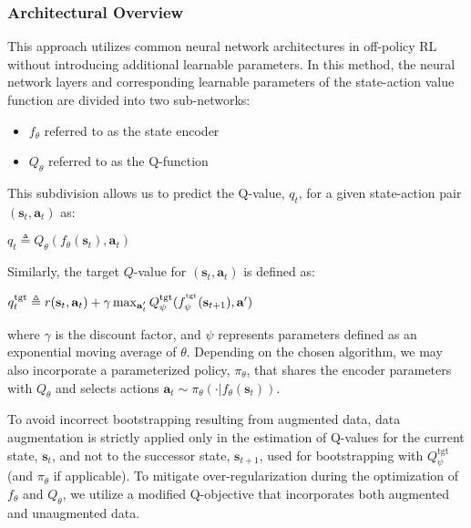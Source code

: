 \subsubsection{\textbf{Architectural Overview}}
This approach utilizes common neural network architectures in off-policy RL without introducing additional learnable parameters. In this method, the neural network layers and corresponding learnable parameters of the state-action value function are divided into two sub-networks:
\begin{itemize}
    \item $f_{\theta}$ referred to as the state encoder
    \item $Q_{\theta}$ referred to as the Q-function
\end{itemize}
This subdivision allows us to predict the Q-value, $q_{t}$, for a given state-action pair $(\mathbf{s}_{t}, \mathbf{a}_{t})$ as:
\begin{center}
$q_{t} \triangleq Q_{\theta}(f_{\theta}(\mathbf{s}_{t}), \mathbf{a}_{t})$
\end{center}
Similarly, the target $Q$-value for $(\mathbf{s}_{t}, \mathbf{a}_{t})$ is defined as:
\begin{center}
$q^{\textnormal{tgt}}_{t} \triangleq r(\mathbf{s}_{t}, \mathbf{a}_{t}) + \gamma \max_{\mathbf{a}'_{t}} Q^{\textnormal{tgt}}_{\psi}(f^{^{\textnormal{tgt}}}_{\psi}(\mathbf{s}_{t+1}), \mathbf{a}')$
\end{center}
where $\gamma$ is the discount factor, and $\psi$ represents parameters defined as an exponential moving average of $\theta$. Depending on the chosen algorithm, we may also incorporate a parameterized policy, $\pi_{\theta}$, that shares the encoder parameters with $Q_{\theta}$ and selects actions $\mathbf{a}_{t} \sim \pi_{\theta}(\cdot|f_{\theta}(\mathbf{s}_{t}))$.

To avoid incorrect bootstrapping resulting from augmented data, data augmentation is strictly applied only in the estimation of Q-values for the current state, $\mathbf{s}_{t}$, and not to the successor state, $\mathbf{s}_{t+1}$, used for bootstrapping with $Q^{\text{tgt}}_{\psi}$ (and $\pi_{\theta}$ if applicable). To mitigate over-regularization during the optimization of $f_{\theta}$ and $Q_{\theta}$, we utilize a modified Q-objective that incorporates both augmented and unaugmented data.

